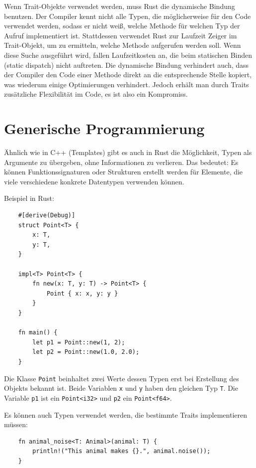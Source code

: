 Wenn Trait-Objekte verwendet werden, muss Rust die dynamische Bindung benutzen. Der Compiler kennt nicht alle Typen, die möglicherweise für den Code verwendet werden, sodass er nicht weiß, welche Methode für welchen Typ der Aufruf implementiert ist. Stattdessen verwendet Rust zur Laufzeit Zeiger im Trait-Objekt, um zu ermitteln, welche Methode aufgerufen werden soll. Wenn diese Suche ausgeführt wird, fallen Laufzeitkosten an, die beim statischen Binden (static dispatch) nicht auftreten. Die dynamische Bindung verhindert auch, dass der Compiler den Code einer Methode direkt an die entsprechende Stelle kopiert, was wiederum einige Optimierungen verhindert. Jedoch erhält man durch Traits zusätzliche Flexibilität im Code, es ist also ein Kompromiss.


\section{Generische Programmierung}

Ähnlich wie in C++ (Templates) gibt es auch in Rust die Möglichkeit, Typen als Argumente zu übergeben, ohne Informationen zu verlieren. Das bedeutet: Es können Funktionssignaturen oder Strukturen erstellt werden für Elemente, die viele verschiedene konkrete Datentypen verwenden können.

Beispiel in Rust:

\begin{lstlisting}
    #[derive(Debug)]
    struct Point<T> {
        x: T,
        y: T,
    }
    
    impl<T> Point<T> {
        fn new(x: T, y: T) -> Point<T> {
            Point { x: x, y: y }
        }
    }
    
    fn main() {
        let p1 = Point::new(1, 2);
        let p2 = Point::new(1.0, 2.0);
    }
\end{lstlisting}

Die Klasse \verb"Point" beinhaltet zwei Werte dessen Typen erst bei Erstellung des Objekts bekannt ist. Beide Variablen \verb"x" und \verb"y" haben den gleichen Typ \verb"T". Die Variable \verb"p1" ist ein \verb"Point<i32>" und \verb"p2" ein \verb"Point<f64>".

Es können auch Typen verwendet werden, die bestimmte Traits implementieren müssen:

\begin{lstlisting}
    fn animal_noise<T: Animal>(animal: T) {
        println!("This animal makes {}.", animal.noise());
    }
\end{lstlisting}

